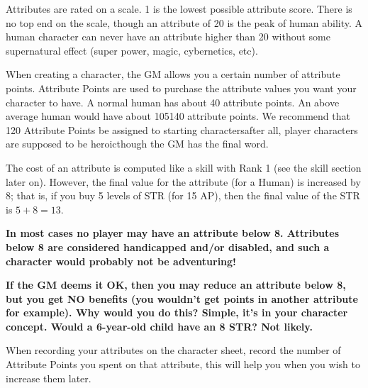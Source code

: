 \documentclass[twoside]{book}
\begin{document}
    {  
     Attributes are rated on a scale. 1 is the lowest
               possible attribute score. There is no top end on the
               scale, though an attribute of 20 is the peak of human
               ability. A human character can never have an attribute
               higher than 20 without some supernatural effect (super
               power, magic, cybernetics, etc). 
    }
  
    {  
     When creating a character, the GM allows you a
               certain number of attribute points. Attribute Points are
               used to purchase the attribute values you want your
               character to have. A normal human has about 40 attribute
               points. An above average human would have about
               105140 attribute points. We recommend that 120
               Attribute Points be assigned to starting
               charactersafter all, player characters are supposed
               to be heroicthough the GM has the final word.
               
    }
  
    {  
     The cost of an attribute is computed like a skill
              with Rank 1 (see the skill section later on). However, the
              final value for the attribute (for a Human) is increased by
              8; that is, if you buy 5 levels of STR (for 15 AP), then
              the final value of the STR is \begin{math} 5  +
               8  =    13 \end{math}.
            
    }
  

 \textbf{ In most cases no player may have an attribute below
               8. Attributes below 8 are considered handicapped and/or
               disabled, and such a character would probably not be
               adventuring! }



 \textbf{ If the GM deems it OK, then you may reduce an
               attribute below 8, but you get NO benefits (you
               wouldn't get points in another attribute for
               example). Why would you do this? Simple, it's in
               your character concept. Would a 6-year-old child have an 8
               STR? Not likely. }


    {  
     When recording your attributes on the character
               sheet, record the number of Attribute Points you spent on
               that attribute, this will help you when you wish to
               increase them later. 
    }
  
\end{document}
